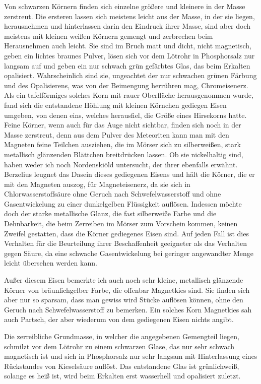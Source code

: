 \documentclass[a4paper, 11pt, oneside]{article}
\begin{document}
Von schwarzen Körnern finden sich einzelne größere und kleinere in der Masse zerstreut. Die ersteren lassen sich meistens leicht aus der Masse, in der sie liegen, herausnehmen und hinterlassen darin den Eindruck ihrer Masse, sind aber doch meistens mit kleinen weißen Körnern gemengt und zerbrechen beim Herausnehmen auch leicht. Sie sind im Bruch matt und dicht, nicht magnetisch, geben ein lichtes braunes Pulver, lösen sich vor dem Lötrohr in Phosphorsalz nur langsam auf und geben ein nur schwach grün gefärbtes Glas, das beim Erkalten opalisiert. Wahrscheinlich sind sie, ungeachtet der nur schwachen grünen Färbung und des Opalisierens, was von der Beimengung herrühren mag, Chromeisenerz. Als ein tafelförmiges solches Korn mit rauer Oberfläche herausgenommen wurde, fand sich die entstandene Höhlung mit kleinen Körnchen gediegen Eisen umgeben, von denen eins, welches herausfiel, die Größe eines Hirsekorns hatte. Feine Körner, wenn auch für das Auge nicht sichtbar, finden sich noch in der Masse zerstreut, denn aus dem Pulver des Meteoriten kann man mit den Magneten feine Teilchen ausziehen, die im Mörser sich zu silberweißen, stark metallisch glänzenden Blättchen breitdrücken lassen. Ob sie nickelhaltig sind, haben weder ich noch Nordenskiöld untersucht, der ihrer ebenfalls erwähnt. Berzelius leugnet das Dasein dieses gediegenen Eisens und hält die Körner, die er mit den Magneten auszog, für Magneteisenerz, da sie sich in Chlorwasserstoffsäure ohne Geruch nach Schwefelwasserstoff und ohne Gasentwickelung zu einer dunkelgelben Flüssigkeit auflösen. Indessen möchte doch der starke metallische Glanz, die fast silberweiße Farbe und die Dehnbarkeit, die beim Zerreiben im Mörser zum Vorschein kommen, keinen Zweifel gestatten, dass die Körner gediegenes Eisen sind. Auf jeden Fall ist dies Verhalten für die Beurteilung ihrer Beschaffenheit geeigneter als das Verhalten gegen Säure, da eine schwache Gasentwickelung bei geringer angewandter Menge leicht übersehen werden kann.

Außer diesem Eisen bemerkte ich auch noch sehr kleine, metallisch glänzende Körner von bräunlichgelber Farbe, die offenbar Magnetkies sind. Sie finden sich aber nur so sparsam, dass man gewiss wird Stücke auflösen können, ohne den Geruch nach Schwefelwasserstoff zu bemerken. Ein solches Korn Magnetkies sah auch Partsch, der aber wiederum von dem gediegenen Eisen nichts angibt.

Die zerreibliche Grundmasse, in welcher die angegebenen Gemengteil liegen, schmilzt vor dem Lötrohr zu einem schwarzen Glase, das nur sehr schwach magnetisch ist und sich in Phosphorsalz nur sehr langsam mit Hinterlassung eines Rückstandes von Kieselsäure auflöst. Das entstandene Glas ist grünlichweiß, solange es heiß ist, wird beim Erkalten erst wasserhell und opalisiert zuletzt.
\end{document}
